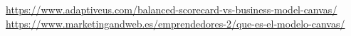 \documentclass[preprint,12pt]{elsarticle}
\begin{document}
	
	


	
	
	
	
	
	 \textcolor{blue}{\url{https://www.adaptiveus.com/balanced-scorecard-vs-business-model-canvas/}}
	 \textcolor{blue}{\url{   https://www.marketingandweb.es/emprendedores-2/que-es-el-modelo-canvas/}}

       
	
	
	
	
	
	
	
\end{document}
